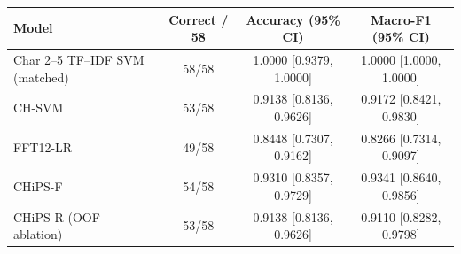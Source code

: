 \begin{table}
  {\tablefont\begin{tabular}{lccc}
    \hline
    Model & Correct / 58 & Accuracy (95\% CI) & Macro-F1 (95\% CI)\\
    \hline
    Char 2--5 TF--IDF SVM (matched) & 58/58 & 1.0000 [0.9379, 1.0000] & 1.0000 [1.0000, 1.0000]\\
    CH-SVM & 53/58 & 0.9138 [0.8136, 0.9626] & 0.9172 [0.8421, 0.9830]\\
    FFT12-LR & 49/58 & 0.8448 [0.7307, 0.9162] & 0.8266 [0.7314, 0.9097]\\
    CHiPS-F & 54/58 & 0.9310 [0.8357, 0.9729] & 0.9341 [0.8640, 0.9856]\\
    CHiPS-R (OOF ablation) & 53/58 & 0.9138 [0.8136, 0.9626] & 0.9110 [0.8282, 0.9798]\\
    \hline
  \end{tabular}}
  {}
\end{table}

